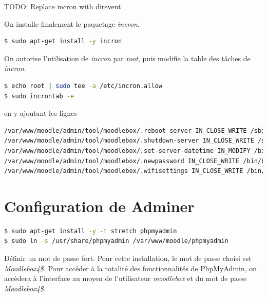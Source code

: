\documentclass[12pt]{article}
\begin{document}
TODO: Replace incron with direvent

On installe finalement le paquetage \emph{incron}.

\begin{lstlisting}[language=bash]
$ sudo apt-get install -y incron
\end{lstlisting}

On autorise l'utilisation de \emph{incron} par \emph{root}, puis modifie la table des tâches de \emph{incron}.

\begin{lstlisting}[language=bash]
$ echo root | sudo tee -a /etc/incron.allow
$ sudo incrontab -e
\end{lstlisting}

en y ajoutant les lignes
\begin{lstlisting}[language=bash]
/var/www/moodle/admin/tool/moodlebox/.reboot-server IN_CLOSE_WRITE /sbin/shutdown -r now
/var/www/moodle/admin/tool/moodlebox/.shutdown-server IN_CLOSE_WRITE /sbin/shutdown -h now
/var/www/moodle/admin/tool/moodlebox/.set-server-datetime IN_MODIFY /bin/bash /var/www/moodle/admin/tool/moodlebox/.set-server-datetime
/var/www/moodle/admin/tool/moodlebox/.newpassword IN_CLOSE_WRITE /bin/bash /var/www/moodle/admin/tool/moodlebox/bin/changepassword.sh
/var/www/moodle/admin/tool/moodlebox/.wifisettings IN_CLOSE_WRITE /bin/bash /var/www/moodle/admin/tool/moodlebox/bin/changewifisettings.sh
\end{lstlisting}


\section{Configuration de Adminer}

\begin{lstlisting}[language=bash]
$ sudo apt-get install -y -t stretch phpmyadmin
$ sudo ln -s /usr/share/phpmyadmin /var/www/moodle/phpmyadmin
\end{lstlisting}
Définir un mot de passe fort.
Pour cette installation, le mot de passe choisi est \emph{Moodlebox4\$}.
Pour accéder à la totalité des fonctionnalités de PhpMyAdmin, on accèdera à l'interface au moyen de l'utilisateur \emph{moodlebox} et du mot de passe \emph{Moodlebox4\$}.

\end{document}

